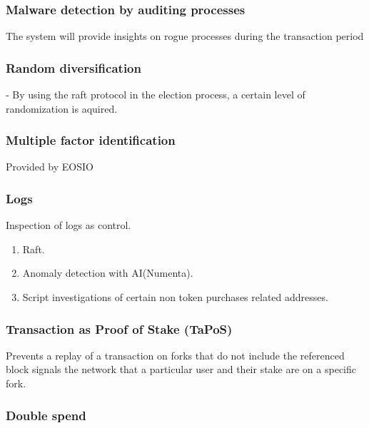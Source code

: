 \documentclass[]{article}
\begin{document}
		\subsubsection{Malware detection by auditing processes}
		The system will provide insights on rogue processes during the transaction period 
		\subsubsection{Random diversification}
		- By using the raft protocol in the election process, a certain level of randomization is aquired.\\
		\subsubsection{Multiple factor identification}
		Provided by EOSIO
		\subsubsection {Logs}
			Inspection of logs as control.
			\begin{enumerate}
				\item Raft.
				\item Anomaly detection with AI(Numenta).
				\item Script investigations of certain non token purchases related addresses.
			\end{enumerate}
		\subsubsection{Transaction as Proof of Stake (TaPoS)}
			Prevents a replay of a transaction on forks that do not include the referenced block signals the network that a particular user and their stake are on a specific fork.
		\subsubsection{Double spend}
\end{document}
